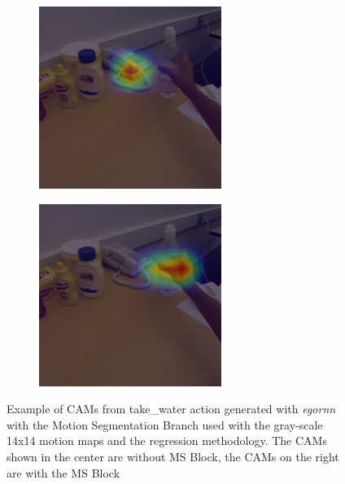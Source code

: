 \documentclass[10pt,twocolumn,hidelinks,letterpaper]{article}
\begin{document}
\begin{figure}[t]
\begin{subfigure}{.32\linewidth}
  \end{subfigure}
  \begin{subfigure}{.32\linewidth}
  	\includegraphics[width=\linewidth]{images/Cams3/S2_take_water/rgb0011_CAM.png}
  \end{subfigure}
  \begin{subfigure}{.32\linewidth}
  	\includegraphics[width=\linewidth]{images/Cams3/S2_take_water/rgb0011_CAM_MS.png}
  \end{subfigure}
  \caption{Example of CAMs from take\_water action generated with \textit{egornn} with the Motion Segmentation Branch used with the gray-scale 14x14 motion maps and the regression methodology. The CAMs shown in the center are without MS Block, the CAMs on the right are with the MS Block}
  \label{cam3_2}
\end{figure}
\end{document}

